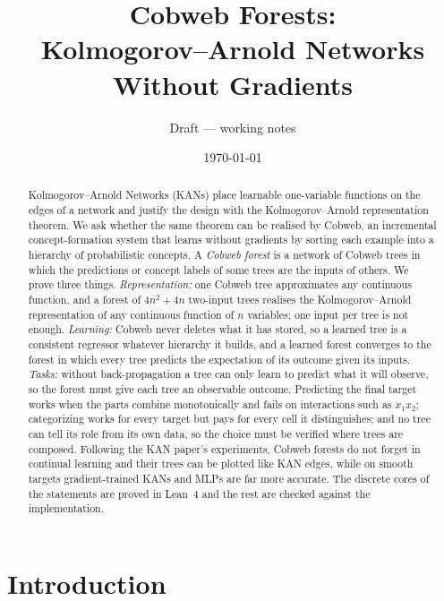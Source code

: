 \documentclass[11pt]{article}
\title{Cobweb Forests:\\ Kolmogorov--Arnold Networks Without Gradients}
\author{Draft --- working notes}
\date{\today}
\theoremstyle{definition}
\theoremstyle{remark}
\begin{document}
\maketitle

\begin{abstract}
Kolmogorov--Arnold Networks (KANs) place learnable one-variable functions on the edges
of a network and justify the design with the Kolmogorov--Arnold representation theorem.
We ask whether the same theorem can be realised by Cobweb, an incremental
concept-formation system that learns without gradients by sorting each example into a
hierarchy of probabilistic concepts.  A \emph{Cobweb forest} is a network of Cobweb trees
in which the predictions or concept labels of some trees are the inputs of others.  We
prove three things.  \emph{Representation:} one Cobweb tree approximates any continuous
function, and a forest of $4n^2+4n$ two-input trees realises the Kolmogorov--Arnold
representation of any continuous function of $n$ variables; one input per tree is not
enough.  \emph{Learning:} Cobweb never deletes what it has stored, so a learned tree is a
consistent regressor whatever hierarchy it builds, and a learned forest converges to the
forest in which every tree predicts the expectation of its outcome given its inputs.
\emph{Tasks:} without back-propagation a tree can only learn to predict what it will
observe, so the forest must give each tree an observable outcome.  Predicting the final
target works when the parts combine monotonically and fails on interactions such as
$x_1x_2$; categorizing works for every target but pays for every cell it distinguishes; and no tree can tell its
role from its own data, so the choice must be verified where trees are composed.
Following the KAN paper's experiments, Cobweb forests do not forget in continual
learning and their trees can be plotted like KAN edges, while on smooth targets
gradient-trained KANs and MLPs are far more accurate.  The discrete cores of the
statements are proved in Lean~4 and the rest are checked against the implementation.
\end{abstract}

\tableofcontents

\section{Introduction}\label{sec:intro}
\end{document}
